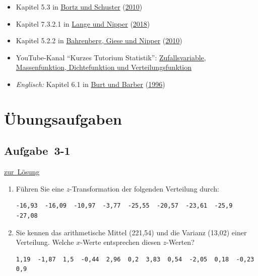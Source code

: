 \documentclass[
  11pt,
  ngerman,
  a4paper,
]{report}
\providecommand{\tightlist}{%
  \setlength{\itemsep}{0pt}\setlength{\parskip}{0pt}}
\begin{document}
\begin{itemize}
\tightlist
\item
  Kapitel 5.3 in \protect\hyperlink{ref-bortz}{Bortz und Schuster} (\protect\hyperlink{ref-bortz}{2010})
\item
  Kapitel 7.3.2.1 in \protect\hyperlink{ref-delange}{Lange und Nipper} (\protect\hyperlink{ref-delange}{2018})
\item
  Kapitel 5.2.2 in \protect\hyperlink{ref-bahrenberg}{Bahrenberg, Giese und Nipper} (\protect\hyperlink{ref-bahrenberg}{2010})
\item
  YouTube-Kanal \enquote{Kurzes Tutorium Statistik}: \href{https://www.youtube.com/watch?v=DoHTsDrzAQk}{Zufallsvariable, Massenfunktion, Dichtefunktion und Verteilungsfunktion}
\item
  \emph{Englisch:} Kapitel 6.1 in \protect\hyperlink{ref-burt}{Burt und Barber} (\protect\hyperlink{ref-burt}{1996})
\end{itemize}

\hypertarget{uxfcbungsaufgaben-2}{%
\section*{Übungsaufgaben}\label{uxfcbungsaufgaben-2}}

\hypertarget{aufgabe-3-1}{%
\subsection{Aufgabe~3-1}\label{aufgabe-3-1}}

\protect\hyperlink{loesung-3-1}{zur~Lösung}

\begin{enumerate}
\def\labelenumi{\alph{enumi})}
\item
  Führen Sie eine \(z\)-Transformation der folgenden Verteilung durch:

\begin{verbatim}
-16,93  -16,09  -10,97  -3,77  -25,55  -20,57  -23,61  -25,9  -27,08
\end{verbatim}
\item
  Sie kennen das arithmetische Mittel (221,54) und die Varianz (13,02) einer Verteilung. Welche \(x\)-Werte entsprechen diesen \(z\)-Werten?

\begin{verbatim}
1,19  -1,87  1,5  -0,44  2,96  0,2  3,83  0,54  -2,05  0,18  -0,23  0,9
\end{verbatim}
\end{enumerate}
\end{document}
